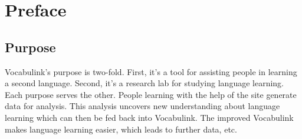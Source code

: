 \chapter{Preface}

\section{Purpose}

Vocabulink's purpose is two-fold. First, it's a tool for assisting people in
learning a second language. Second, it's a research lab for studying language
learning. Each purpose serves the other. People learning with the help of the
site generate data for analysis. This analysis uncovers new understanding about
language learning which can then be fed back into Vocabulink. The improved
Vocabulink makes language learning easier, which leads to further data, etc.
